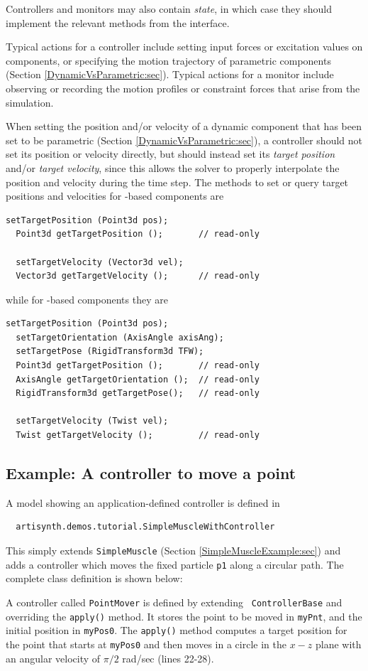 Controllers and monitors may also contain {\it state}, in which case
they should implement the relevant methods from the
 interface.

Typical actions for a controller include setting input forces or
excitation values on components, or specifying the motion trajectory
of parametric components (Section \ref{DynamicVsParametric:sec}).
Typical actions for a monitor include observing or recording
the motion profiles or constraint forces that arise
from the simulation.

When setting the position and/or velocity of a dynamic component that
has been set to be parametric (Section \ref{DynamicVsParametric:sec}),
a controller should not set its position or velocity directly, but
should instead set its {\it target position} and/or {\it target
velocity}, since this allows the solver to properly interpolate the
position and velocity during the time step. The methods to set or
query target positions and velocities for
-based components are
%
\begin{lstlisting}[]
  setTargetPosition (Point3d pos);
  Point3d getTargetPosition ();       // read-only

  setTargetVelocity (Vector3d vel);
  Vector3d getTargetVelocity ();      // read-only
\end{lstlisting}
%
while for
-based components they are
%
\begin{lstlisting}[]
  setTargetPosition (Point3d pos);
  setTargetOrientation (AxisAngle axisAng);
  setTargetPose (RigidTransform3d TFW);
  Point3d getTargetPosition ();       // read-only
  AxisAngle getTargetOrientation ();  // read-only
  RigidTransform3d getTargetPose();   // read-only

  setTargetVelocity (Twist vel);
  Twist getTargetVelocity ();         // read-only
\end{lstlisting}
%

\subsection{Example: A controller to move a point}

A model showing an application-defined controller is defined in
%
\begin{verbatim}
  artisynth.demos.tutorial.SimpleMuscleWithController
\end{verbatim}
%
This simply extends {\tt SimpleMuscle} (Section
\ref{SimpleMuscleExample:sec}) and adds a controller which moves the
fixed particle {\tt p1} along a circular path.  The complete class
definition is shown below:
%
\lstset{numbers=left}

\lstset{numbers=none}
%
A controller called {\tt PointMover} is defined by extending {\tt
ControllerBase} and overriding the {\tt apply()} method. It stores the
point to be moved in {\tt myPnt}, and the initial position in
{\tt myPos0}. The {\tt apply()} method computes a target position for
the point that starts at {\tt myPos0} and then moves in a circle in the
$x-z$ plane with an angular velocity of $\pi/2$ rad/sec (lines 22-28).

